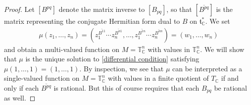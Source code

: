 \documentclass[pdftex]{sigma}
\numberwithin{equation}{section}
\begin{document}
\begin{proof}
Let $[B^{pq}]$ denote the matrix inverse to $[B_{pq}]$, so that $[\overline{B^{pq}}]$ is the matrix representing the conjugate Hermitian form dual to $B$ on ${\mathfrak t}_{\mathbb C}^*$. We set
\begin{gather*}%
\mu(z_1,\dots,z_n)=\left(z_1^{\overline{B^{11}}}\cdots z_n^{\overline{B^{n1}}},\dots,z_1^{\overline{B^{1n}}}\cdots z_n^{\overline{B^{nn}}}\right)=(w_1,\dots,w_n)
\end{gather*}
and obtain a multi-valued function on $M={\mathbb T}_{\mathbb C}^n$ with values in ${\mathbb T}_{\mathbb C}^n$. We will show that $\mu$ is the unique solution to \eqref{differential condition} satisfying $\mu(1,\dots,1)=(1,\dots,1)$. By inspection, we see that $\mu$ can be interpreted as a single-valued function on $M={\mathbb T}_{\mathbb C}^n$ with values in a f\/inite quotient of $T_{\mathbb C}$ if and only if each $\overline{B^{pq}}$ is rational. But this of course requires that each $B_{pq}$ be rational as well.


\end{proof}
\end{document}
